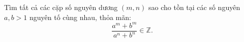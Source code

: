 \ifshowproblem
\begin{problem}\label{example:MEMO-2015-I-P4}
    Tìm tất cả các cặp số nguyên dương \( (m, n) \) sao cho tồn tại các số nguyên \( a, b > 1 \) nguyên tố cùng nhau, thỏa mãn:
    \[
        \frac{a^m + b^m}{a^n + b^n} \in \mathbb{Z}.
    \]
\end{problem}
\fi

\fi